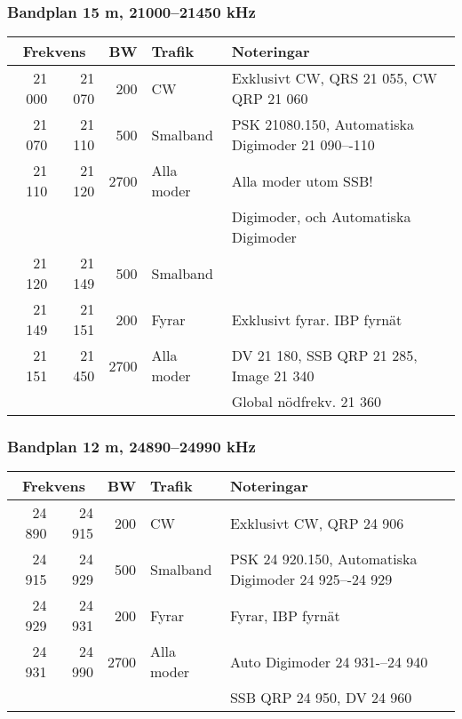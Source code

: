\begin{landscape}
\subsubsection{Bandplan 15 m, 21000--21450 kHz}
\begin{tabular}{rrrll}
\multicolumn{2}{c}{\textbf{Frekvens}} & \textbf{BW} & \textbf{Trafik} & \textbf{Noteringar} \\ \hline

21 000 & 21 070 & 200  & CW         & Exklusivt CW, QRS 21 055, CW QRP 21 060          \\ \hline
21 070 & 21 110 & 500  & Smalband   & PSK 21080.150, Automatiska Digimoder 21 090–-110 \\
21 110 & 21 120 & 2700 & Alla moder & Alla moder utom SSB!                             \\
       &        &      &            & Digimoder, och Automatiska Digimoder             \\ \hline
21 120 & 21 149 & 500  & Smalband   &                                                  \\ \hline
21 149 & 21 151 & 200  & Fyrar      & Exklusivt fyrar. IBP fyrnät                      \\ \hline
21 151 & 21 450 & 2700 & Alla moder & DV 21 180, SSB QRP 21 285, Image 21 340          \\
       &        &      &            & Global nödfrekv. 21 360                          \\ \hline
\end{tabular}



\subsubsection{Bandplan 12 m, 24890--24990 kHz}
\begin{tabular}{rrrll}
\multicolumn{2}{c}{\textbf{Frekvens}} & \textbf{BW} & \textbf{Trafik} & \textbf{Noteringar} \\ \hline

24 890 & 24 915 & 200  & CW         & Exklusivt CW, QRP 24 906                             \\ \hline
24 915 & 24 929 & 500  & Smalband   & PSK 24 920.150, Automatiska Digimoder 24 925–-24 929 \\ \hline
24 929 & 24 931 & 200  & Fyrar      & Fyrar, IBP fyrnät                                    \\ \hline
24 931 & 24 990 & 2700 & Alla moder & Auto Digimoder 24 931-–24 940                        \\
       &        &      &            & SSB QRP 24 950, DV 24 960                            \\ \hline
\end{tabular}




\end{landscape}
